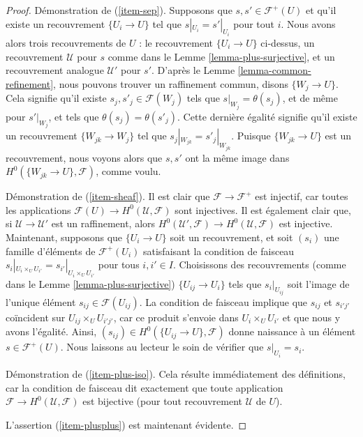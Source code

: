 \begin{proof}
Démonstration de (\ref{item-sep}).
Supposons que $s, s' \in \mathcal{F}^+(U)$ et qu’il
existe un recouvrement $\{U_i \to U\}$ tel que
$s|_{U_i} = s'|_{U_i}$ pour tout $i$. Nous avons alors trois recouvrements
de $U$ : le recouvrement $\{U_i \to U\}$ ci-dessus, un recouvrement $\mathcal{U}$
pour $s$ comme dans le Lemme \ref{lemma-plus-surjective},
et un recouvrement analogue $\mathcal{U}'$ pour $s'$. D’après le Lemme
\ref{lemma-common-refinement}, nous pouvons trouver un raffinement commun,
disons $\{W_j \to U\}$. Cela signifie qu’il existe $s_j, s'_j \in \mathcal{F}(W_j)$
tels que $s|_{W_j} = \theta(s_j)$, et de même pour $s'|_{W_j}$, et
tels que $\theta(s_j) = \theta(s'_j)$. Cette dernière égalité signifie
qu’il existe un recouvrement $\{W_{jk} \to W_j\}$ tel que
$s_j|_{W_{jk}} = s'_j|_{W_{jk}}$. Puisque $\{W_{jk} \to U\}$
est un recouvrement, nous voyons alors que $s, s'$ ont la même image dans
$H^0(\{W_{jk} \to U\}, \mathcal{F})$, comme voulu.

\medskip\noindent
Démonstration de (\ref{item-sheaf}). Il est clair que $\mathcal{F} \to
\mathcal{F}^+$ est injectif, car toutes les applications
$\mathcal{F}(U) \to H^0(\mathcal{U}, \mathcal{F})$
sont injectives. Il est également clair que, si $\mathcal{U} \to
\mathcal{U}'$ est un raffinement, alors $H^0(\mathcal{U}', \mathcal{F})
\to H^0(\mathcal{U}, \mathcal{F})$ est injective. Maintenant,
supposons que $\{U_i \to U\}$ soit un recouvrement, et soit
$(s_i)$ une famille d’éléments de $\mathcal{F}^+(U_i)$
satisfaisant la condition de faisceau
$s_i|_{U_i \times_U U_{i'}} = s_{i'}|_{U_i \times_U U_{i'}}$
pour tous $i, i' \in I$. Choisissons des recouvrements (comme dans le
Lemme \ref{lemma-plus-surjective}) $\{U_{ij} \to U_i\}$
tels que $s_i|_{U_{ij}}$ soit l’image de l’unique
élément $s_{ij} \in \mathcal{F}(U_{ij})$. La condition de faisceau
implique que $s_{ij}$ et $s_{i'j'}$ coïncident sur
$U_{ij} \times_U U_{i'j'}$, car ce produit s’envoie dans
$U_i \times_U U_{i'}$ et que nous y avons l’égalité.
Ainsi, $(s_{ij}) \in H^0(\{U_{ij} \to U\}, \mathcal{F})$
donne naissance à un élément $s \in \mathcal{F}^+(U)$. Nous laissons
au lecteur le soin de vérifier que $s|_{U_i} = s_i$.

\medskip\noindent
Démonstration de (\ref{item-plus-iso}). Cela résulte immédiatement des définitions,
car la condition de faisceau dit exactement que toute application
$\mathcal{F} \to H^0(\mathcal{U}, \mathcal{F})$ est bijective
(pour tout recouvrement $\mathcal{U}$ de $U$).

\medskip\noindent
L’assertion (\ref{item-plusplus}) est maintenant évidente.
\end{proof}

